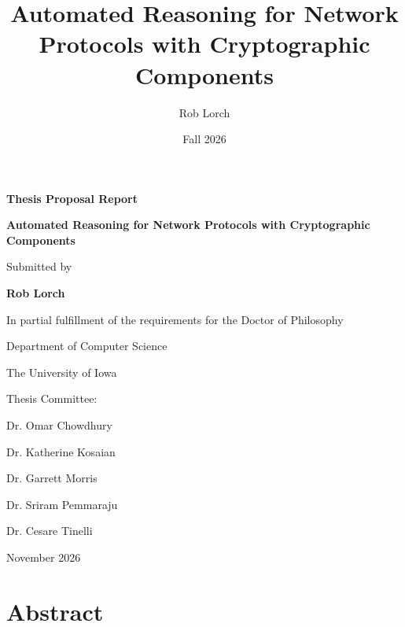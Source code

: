 \documentclass{article}
\title{Automated Reasoning for Network Protocols with Cryptographic Components}
\author{Rob Lorch}
\date{Fall 2026}
\theoremstyle{definition}
\begin{document}
\begin{titlepage}
    \centering

    {\Large \textbf{Thesis Proposal Report} \par}
    \vspace{0.5in}

    {\LARGE \textbf{Automated Reasoning for Network Protocols with Cryptographic Components} \par}
    \vspace{.75in}

    {\large
    Submitted by\par
    \vspace{0.2in}
    \textbf{Rob Lorch}\par
    }
    \vspace{0.55in}

    {\large
    In partial fulfillment of the requirements for the Doctor of Philosophy\par
    Department of Computer Science\par
    The University of Iowa\par
    }
    \vspace{0.75in}

    {\large
    Thesis Committee:\par
    \vspace{0.2in}
    Dr. Omar Chowdhury\par 
    Dr. Katherine Kosaian\par
    Dr. Garrett Morris\par
    Dr. Sriram Pemmaraju\par 
    Dr. Cesare Tinelli\par
    }
    \vspace{1in}

    {\large
    November 2026\par
    }

    \vfill
\end{titlepage}

\section*{Abstract}
\end{document}

